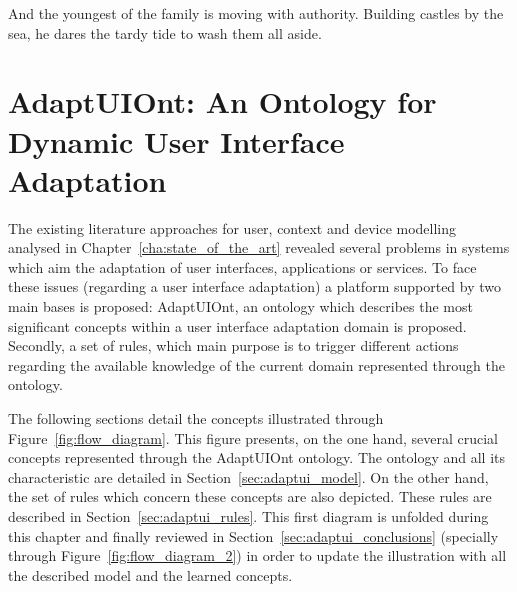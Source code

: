 
\begin{savequote}[50mm]
And the youngest of the family is moving with authority. Building castles by the 
sea, he dares the tardy tide to wash them all aside.
\end{savequote}


\chapter{AdaptUIOnt: An Ontology for Dynamic User Interface Adaptation}
\label{cha:ontology_model}

\ifpdf
    \graphicspath{{3_ontology_model/figures/PNG/}{3_ontology_model/figures/PDF/}{3_ontology_model/figures/}}
\else
    \graphicspath{{3_ontology_model/figures/EPS/}{3_ontology_model/figures/}}
\fi

The existing literature approaches for user, context and device modelling
analysed in Chapter~\ref{cha:state_of_the_art} revealed several problems in
systems which aim the adaptation of user interfaces, applications or services.
To face these issues (regarding a user interface adaptation) a platform supported 
by two main bases is proposed: AdaptUIOnt, an ontology which describes the most 
significant concepts within a user interface adaptation domain is proposed. Secondly,
a set of rules, which main purpose is to trigger different actions regarding the 
available knowledge of the current domain represented through the ontology.

The following sections detail the concepts illustrated through Figure~\ref{fig:flow_diagram}.
This figure presents, on the one hand, several crucial concepts represented
through the AdaptUIOnt ontology. The ontology and all its characteristic are
detailed in Section~\ref{sec:adaptui_model}. On the other hand, the set of rules
which concern these concepts are also depicted. These rules are described in
Section~\ref{sec:adaptui_rules}. This first diagram is unfolded during this
chapter and finally reviewed in Section~\ref{sec:adaptui_conclusions} (specially 
through Figure~\ref{fig:flow_diagram_2}) in order to update the illustration with 
all the described model and the learned concepts.

